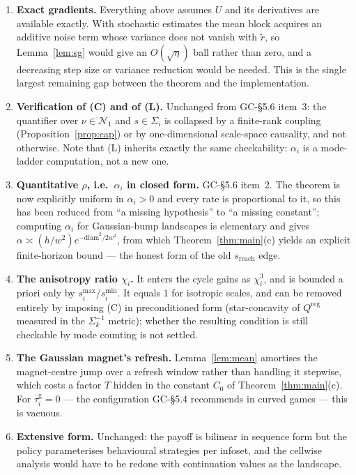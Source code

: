 \documentclass[11pt]{article}
\theoremstyle{definition}
\newcommand{\cN}{\mathcal{N}}
\newcommand{\GC}[1]{\textsf{GC-#1}}
\begin{document}
\begin{enumerate}
\item \textbf{Exact gradients.} Everything above assumes $U$ and its derivatives
  are available exactly. With stochastic estimates the mean block acquires an
  additive noise term whose variance does not vanish with $\tilde r$, so
  Lemma~\ref{lem:sg} would give an $O(\sqrt{\eta})$ ball rather than zero, and a
  decreasing step size or variance reduction would be needed. This is the single
  largest remaining gap between the theorem and the implementation.
\item \textbf{Verification of (C) and of (L).} Unchanged from \GC{\S5.6} item~3:
  the quantifier over $\nu \in \cN_1$ and $s \in \Sigma_i$ is collapsed by a
  finite-rank coupling (Proposition~\ref{prop:cap}) or by one-dimensional
  scale-space causality, and not otherwise. Note that (L) inherits exactly the
  same checkability: $\alpha_i$ is a mode-ladder computation, not a new one.
\item \textbf{Quantitative $\rho$, i.e.\ $\alpha_i$ in closed form.}
  \GC{\S5.6} item~2. The theorem is now explicitly uniform in $\alpha_i > 0$ and
  every rate is proportional to it, so this has been reduced from ``a missing
  hypothesis'' to ``a missing constant''; computing $\alpha_i$ for
  Gaussian-bump landscapes is elementary and gives
  $\alpha \asymp (h/w^2)e^{-\mathrm{diam}^2/2w^2}$, from which
  Theorem~\ref{thm:main}(c) yields an explicit finite-horizon bound --- the honest
  form of the old $s_{\mathrm{reach}}$ edge.
\item \textbf{The anisotropy ratio $\chi_i$.} It enters the cycle gains as
  $\chi_i^3$, and is bounded a priori only by $s^{\max}_i/s^{\min}_i$. It equals
  $1$ for isotropic scales, and can be removed entirely by imposing (C) in
  preconditioned form (star-concavity of $Q^{\mathrm{reg}}$ measured in the
  $\Sigma_k^{-1}$ metric); whether the resulting condition is still checkable by
  mode counting is not settled.
\item \textbf{The Gaussian magnet's refresh.} Lemma~\ref{lem:mean} amortises the
  magnet-centre jump over a refresh window rather than handling it stepwise, which
  costs a factor $T$ hidden in the constant $C_0$ of Theorem~\ref{thm:main}(c).
  For $\tau^{\mathrm g}_i = 0$ --- the configuration \GC{\S5.4} recommends in
  curved games --- this is vacuous.
\item \textbf{Extensive form.} Unchanged: the payoff is bilinear in sequence form
  but the policy parameterises behavioural strategies per infoset, and the
  cellwise analysis would have to be redone with continuation values as the
  landscape.
\end{enumerate}
\end{document}
